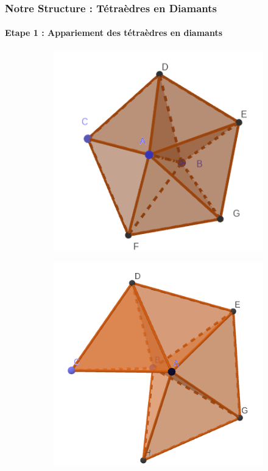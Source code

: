\documentclass[9pt]{beamer}
\begin{document}
\begin{frame}
\small
\frametitle{Notre Structure : Tétraèdres en Diamants}
\framesubtitle{Etape 1 : Appariement des tétraèdres en diamants}
\begin{figure}[H]
\centering
\begin{subfigure}{.24\textwidth}
  \centering
  \includegraphics[scale=0.21]{Images/full_diamond}
  \caption{}
\end{subfigure}%
\begin{subfigure}{.24\textwidth}
  \centering
  \includegraphics[scale=0.17]{Images/not_full_diamond}
  \caption{}
\end{subfigure}
\begin{subfigure}{.24\textwidth}
  \centering

\end{subfigure}
\end{figure}
\end{frame}
\end{document}
